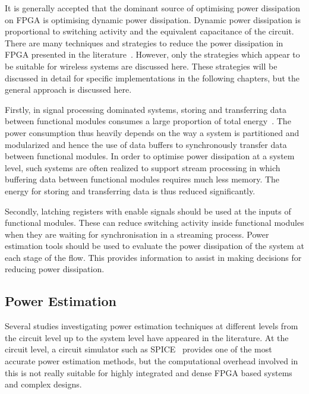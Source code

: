 It is generally accepted that the dominant source of optimising power dissipation on FPGA is optimising dynamic power dissipation.
Dynamic power dissipation is proportional to switching activity and the equivalent capacitance of the circuit.
There are many techniques and strategies to reduce the power dissipation in FPGA presented in the literature~\cite{Danckaert1999,Kovacs2000,Czapski2007,Liu2009,Ahuja2010}.
However, only the strategies which appear to be suitable for wireless systems are discussed here.
These strategies will be discussed in detail for specific implementations in the following chapters, but the general approach is discussed here.

Firstly, in signal processing dominated systems, storing and transferring data between functional modules consumes a large proportion of total energy~\cite{Liu2009}.
The power consumption thus heavily depends on the way a system is partitioned and modularized and hence the use of data buffers to synchronously transfer data between functional modules.
In order to optimise power dissipation at a system level, such systems are often realized to support stream processing in which buffering data between functional modules requires much less memory.
The energy for storing and transferring data is thus reduced significantly.

Secondly, latching registers with enable signals should be used at the inputs of functional modules.
These can reduce switching activity inside functional modules when they are waiting for synchronisation in a streaming process.
Power estimation tools should be used to evaluate the power dissipation of the system at each stage of the flow.
This provides information to assist in making decisions for reducing power dissipation.

\subsection{Power Estimation}

Several studies investigating power estimation techniques at different levels from the circuit level up to the system level have appeared in the literature.
At the circuit level, a circuit simulator such as SPICE~\cite{Deng1994} provides one of the most accurate power estimation methods, but the computational overhead involved in this is not really suitable for highly integrated and dense FPGA based systems and complex designs.

